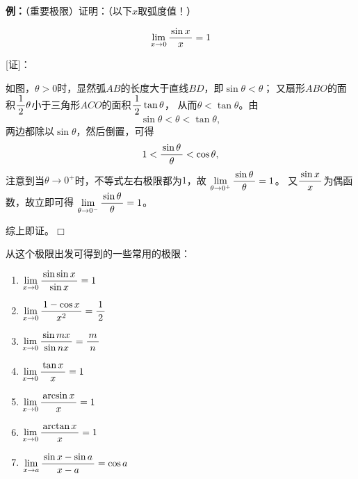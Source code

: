 {\bf 例：}（重要极限）证明：（{\color{red}以下$x$取弧度值！}）
\begin{thx}
	$$\limx{0}\df {\sin x}x=1$$
\end{thx}

[证]：
\begin{center}
\end{center}

如图，$\theta>0$时，显然弧$AB$的长度大于直线$BD$，即$\sin\theta<\theta$；
又扇形$ABO$的面积$\df12\theta$小于三角形$ACO$的面积$\df12\tan\theta$，
从而$\theta<\tan\theta$。由
$$\sin\theta<\theta<\tan\theta,$$
两边都除以$\sin\theta$，然后倒置，可得
$$1<\df{\sin\theta}{\theta}<\cos\theta,$$
注意到当$\theta\to 0^+$时，不等式左右极限都为$1$，故
$\lim\limits_{\theta\to0^+}\df{\sin\theta}{\theta}=1$。
又$\df{\sin x}x$为偶函数，故立即可得
$\lim\limits_{\theta\to0^-}\df{\sin\theta}{\theta}=1$。

综上即证。\hfill$\Box$

从这个极限出发可得到的一些常用的极限：
\begin{thx}
	\begin{enumerate}[(1)]
	  \item $\limx{0}\df{\sin\sin x}{\sin x}=1$ 
	  \item $\limx 0\df{1-\cos x}{x^2}=\df12$ 
	  \item $\limx 0\df{\sin mx}{\sin nx}=\df mn$
	  \item $\limx 0\df{\tan x}{x}=1$
	  \item $\limx 0\df{\arcsin x}x=1$
	  \item $\limx 0\df{\arctan x}x=1$
	  \item $\limx a\df{\sin x-\sin a}{x-a}=\cos a$
	\end{enumerate}
\end{thx}

